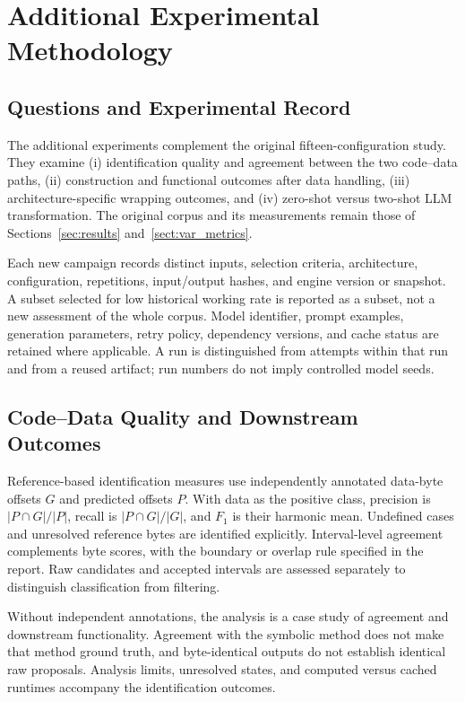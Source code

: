 \section{Additional Experimental Methodology}\label{sec:methodology}
\subsection{Questions and Experimental Record}
The additional experiments complement the original fifteen-configuration
study. They examine (i) identification quality and agreement between
the two code--data paths, (ii) construction and functional outcomes
after data handling, (iii) architecture-specific wrapping outcomes,
and (iv) zero-shot versus two-shot LLM transformation. The original
corpus and its measurements remain those of
Sections~\ref{sec:results} and~\ref{sect:var_metrics}.

Each new campaign records distinct inputs, selection criteria,
architecture, configuration, repetitions, input/output hashes, and
engine version or snapshot. A subset selected for low historical
working rate is reported as a subset, not a new assessment of the
whole corpus. Model identifier, prompt examples, generation parameters,
retry policy, dependency versions, and cache status are retained where
applicable. A run is distinguished from attempts within that run and
from a reused artifact; run numbers do not imply controlled model seeds.

\subsection{Code--Data Quality and Downstream Outcomes}
Reference-based identification measures use independently annotated
data-byte offsets $G$ and predicted offsets $P$. With data as the
positive class, precision is $|P\cap G|/|P|$, recall is
$|P\cap G|/|G|$, and $F_1$ is their harmonic mean. Undefined cases and
unresolved reference bytes are identified explicitly. Interval-level
agreement complements byte scores, with the boundary or overlap rule
specified in the report. Raw candidates and accepted intervals are
assessed separately to distinguish classification from filtering.

Without independent annotations, the analysis is a case study of
agreement and downstream functionality. Agreement with the symbolic
method does not make that method ground truth, and byte-identical
outputs do not establish identical raw proposals. Analysis limits,
unresolved states, and computed versus cached runtimes accompany the
identification outcomes.

